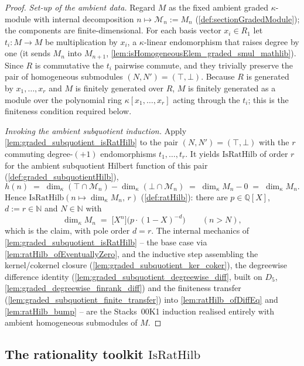 \begin{proof}
  \emph{Set-up of the ambient data.} Regard \(M\) as the fixed ambient graded
  \(\kappa\)-module with internal decomposition \(n \mapsto \mathcal{M}_n := M_n\)
  (\cref{def:sectionGradedModule}); the components are finite-dimensional. For each
  basis vector \(x_i \in R_1\) let \(t_i : M \to M\) be multiplication by \(x_i\), a
  \(\kappa\)-linear endomorphism that raises degree by one (it sends \(M_n\) into
  \(M_{n+1}\), \cref{lem:isHomogeneousElem_graded_smul_mathlib}). Since \(R\) is
  commutative the \(t_i\) pairwise commute, and they trivially preserve the pair of
  homogeneous submodules \((N, N') = (\top, \bot)\). Because \(R\) is generated by
  \(x_1, \dots, x_r\) and \(M\) is finitely generated over \(R\), \(M\) is finitely
  generated as a module over the polynomial ring \(\kappa[x_1, \dots, x_r]\) acting
  through the \(t_i\); this is the finiteness condition required below.

  \emph{Invoking the ambient subquotient induction.} Apply
  \cref{lem:graded_subquotient_isRatHilb} to the pair \((N, N') = (\top, \bot)\)
  with the \(r\) commuting degree-\((+1)\) endomorphisms \(t_1, \dots, t_r\). It
  yields \(\mathrm{IsRatHilb}\) of order \(r\) for the ambient subquotient Hilbert
  function of this pair (\cref{def:graded_subquotientHilb}),
  \[
    h(n) \;=\; \dim_\kappa(\top \cap \mathcal{M}_n) - \dim_\kappa(\bot \cap \mathcal{M}_n)
      \;=\; \dim_\kappa M_n - 0 \;=\; \dim_\kappa M_n .
  \]
  Hence \(\mathrm{IsRatHilb}(n \mapsto \dim_\kappa M_n,\, r)\) (\cref{def:ratHilb}):
  there are \(p \in \mathbb{Q}[X]\), \(d := r \in \mathbb{N}\) and \(N \in \mathbb{N}\)
  with
  \[
    \dim_\kappa M_n \;=\; \bigl[X^n\bigr]\bigl(p \cdot (1 - X)^{-d}\bigr)
    \qquad (n > N),
  \]
  which is the claim, with pole order \(d = r\). The internal mechanics of
  \cref{lem:graded_subquotient_isRatHilb} -- the base case via
  \cref{lem:ratHilb_ofEventuallyZero}, and the inductive step assembling the
  kernel/cokernel closure (\cref{lem:graded_subquotient_ker_coker}), the degreewise
  difference identity (\cref{lem:graded_subquotient_degreewise_diff}, built on
  \(D_5\), \cref{lem:graded_degreewise_finrank_diff}) and the finiteness transfer
  (\cref{lem:graded_subquotient_finite_transfer}) into
  \cref{lem:ratHilb_ofDiffEq} and \cref{lem:ratHilb_bump} -- are the Stacks~00K1
  induction realised entirely with ambient homogeneous submodules of \(M\).
\end{proof}

\subsection{The rationality toolkit \texorpdfstring{\(\mathrm{IsRatHilb}\)}{IsRatHilb}}
\label{subsec:isRatHilb}

